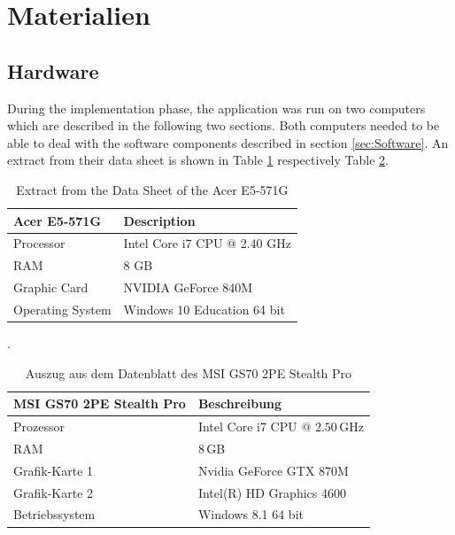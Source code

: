 
\section{Materialien}\label{sec:Materials}

\subsection{Hardware}\label{sec:Hardware}

During the implementation phase, the application was run on two computers which are described in the following two sections. Both computers needed to be able to deal with the software components described in section \ref{sec:Software}. An extract from their data sheet is shown in Table \ref{tab:Computer1} respectively Table \ref{tab:Computer2}.


\begin{table}[H]
	\centering
	\begin{tabular}{|l|l|}
		\hline
		\Absatzbox{}
		\textbf{Acer E5-571G}& \textbf{Description} \\
		\hline
		Processor & Intel Core i7 CPU @ 2.40 GHz\\
		\hline
		RAM & 8 GB  \\
		\hline 
		Graphic Card & NVIDIA GeForce 840M\\
		\hline
		Operating System &  Windows 10 Education 64 bit   \\
		\hline
	\end{tabular}
	\caption[Extract from the Data Sheet of the Acer E5-571G]{Extract from the Data Sheet of the Acer E5-571G}.
	\label{tab:Computer1}
\end{table}

\begin{table}[H]
	\centering
	\begin{tabular}{|l|l|}
		\hline
		\Absatzbox{}
		\textbf{MSI GS70 2PE Stealth Pro}& \textbf{Beschreibung} \\
		\hline
		Prozessor & Intel Core i7 CPU @ $2.50\,$GHz \\
		\hline
		RAM & $8\,$GB \\
		\hline 
		Grafik-Karte 1 & Nvidia GeForce GTX 870M\\
		\hline
		Grafik-Karte 2 & Intel(R) HD Graphics 4600\\
		\hline
		Betriebssystem & Windows 8.1 64 bit \\
		\hline
	\end{tabular}
	\caption[Auszug aus dem Datenblatt des MSI GS70 2PE Stealth Pro]{Auszug aus dem Datenblatt des MSI GS70 2PE Stealth Pro}
	\label{tab:Computer2}
\end{table}

